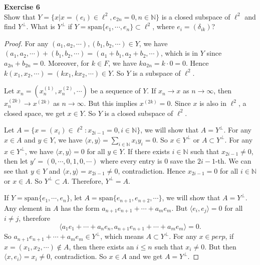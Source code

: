 \documentclass[12pt, a4paper]{article}
\theoremstyle{plain}
\newcommand{\N}{\mathbb{N}}
\newenvironment{exercise}[2][Exercise]
    { \begin{mdframed}[backgroundcolor=gray!20] \textbf{#1 #2} \\}
    {  \end{mdframed}}
\begin{document}
\begin{exercise}{6}
Show that $Y=\{x|x=(e_i)\in \ell^2, e_{2n} = 0, n\in \N\}$ is a closed subspace of $\ell^2$ and find $Y^\perp$. What is $Y^\perp$ if $Y=\text{span}\{e_1,\cdots,e_n\}\subset \ell^2$, where $e_i = (\delta_{ik})$?
\end{exercise}
	\begin{proof}
	For any $(a_1,a_2,\cdots), (b_1,b_2,\cdots)\in Y$, we have $(a_1,a_2,\cdots)+(b_1,b_2,\cdots) = (a_1+b_1,a_2+b_2,\cdots)$, which is in $Y$ since $a_{2n}+b_{2n}=0$. Moreover, for $k\in F$, we have $ka_{2n}=k\cdot 0=0$. Hence $k(x_1,x_2,\cdots)=(kx_1,kx_2,\cdots)\in Y$. So $Y$ is a subspace of $\ell^2$. 
	
	Let $x_n = (x_n^{(1)},x_n^{(2)},\cdots)$ be a sequence of $Y$. If $x_n\rightarrow x$ as $n\rightarrow \infty$, then $x_{n}^{(2k)}\rightarrow x^{(2k)}$ as $n\rightarrow \infty$. But this implies $x^{(2k)}=0$. Since $x$ is also in $\ell^2$, a closed space, we get $x\in Y$. So $Y$ is a closed subspace of $\ell^2$.
	
	Let $A=\{x=(x_i)\in \ell^2:x_{2i-1}=0, i\in\N\}$, we will show that $A=Y^\perp$. For any $x\in A$ and $y\in Y$, we have $\langle{x,y}\rangle = \sum_{i\in \N}{x_iy_i}=0$. So $x\in Y^\perp$ or $A\subset Y^\perp$. For any $x\in Y^\perp$, we have $\langle{x,y}\rangle = 0$ for all $y\in Y$. If there exists $i\in \N$ such that $x_{2i-1}\neq 0$, then let $y'=(0,\cdots,0,1,0,\cdots)$ where every entry is $0$ save the $2i-1$-th. We can see that $y\in Y$ and $\langle{x,y}\rangle = x_{2i-1}\neq 0$, contradiction. Hence $x_{2i-1}=0$ for all $i\in\N$ or $x\in A$. So $Y^\perp\subset A$. Therefore, $Y^\perp=A$.
	
	If $Y=\text{span}\{e_1,\cdots,e_n\}$, let $A = \text{span}\{e_{n+1},e_{n+2},\cdots\}$, we will show that $A=Y^\perp$. Any element in $A$ has the form $a_{n+1}e_{n+1}+\cdots+a_me_m$. But $\langle{e_i,e_j}\rangle = 0$ for all $i\neq j$, therefore
	\[
	\langle{a_1e_1+\cdots+a_ne_n,a_{n+1}e_{n+1}+\cdots + a_me_m}\rangle=0.
	\]
	So $a_{n+1}e_{n+1}+\cdots+a_me_m\in Y^\perp$, which means $A\subset Y^\perp$. For any $x\in perp$, if $x=(x_1,x_2,\cdots)\notin A$, then there exists an $i\leq n$ such that $x_i\neq 0$. But then $\langle{x,e_i}\rangle = x_i\neq 0$, contradiction. So $x\in A$ and we get $A=Y^\perp$.
	\end{proof}
\end{document}
